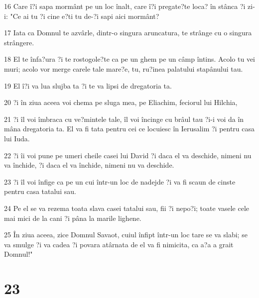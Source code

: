 \par 16 Care î?i sapa mormânt pe un loc înalt, care î?i pregate?te loca? în stânca ?i zi-i: "Ce ai tu ?i cine e?ti tu de-?i sapi aici mormânt?
\par 17 Iata ca Domnul te azvârle, dintr-o singura aruncatura, te strânge cu o singura strângere.
\par 18 El te înfa?ura ?i te rostogole?te ca pe un ghem pe un câmp întins. Acolo tu vei muri; acolo vor merge carele tale mare?e, tu, ru?inea palatului stapânului tau.
\par 19 El î?i va lua slujba ta ?i te va lipsi de dregatoria ta.
\par 20 ?i în ziua aceea voi chema pe sluga mea, pe Eliachim, feciorul lui Hilchia,
\par 21 ?i îl voi îmbraca cu ve?mintele tale, îl voi încinge cu brâul tau ?i-i voi da în mâna dregatoria ta. El va fi tata pentru cei ce locuiesc în Ierusalim ?i pentru casa lui Iuda.
\par 22 ?i îi voi pune pe umeri cheile casei lui David ?i daca el va deschide, nimeni nu va închide, ?i daca el va închide, nimeni nu va deschide.
\par 23 ?i îl voi înfige ca pe un cui într-un loc de nadejde ?i va fi scaun de cinste pentru casa tatalui sau.
\par 24 Pe el se va rezema toata slava casei tatalui sau, fii ?i nepo?i; toate vasele cele mai mici de la cani ?i pâna la marile lighene.
\par 25 În ziua aceea, zice Domnul Savaot, cuiul înfipt într-un loc tare se va slabi; se va smulge ?i va cadea ?i povara atârnata de el va fi nimicita, ca a?a a grait Domnul!"

\chapter{23}

